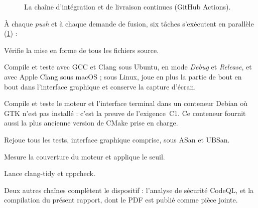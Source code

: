 \begin{figure}[ht]
    \caption{La chaîne d'intégration et de livraison continues (GitHub Actions).}
    \label{fig-ci}
\end{figure}

À chaque \emph{push} et à chaque demande de fusion, six tâches s'exécutent en parallèle
(\cref{fig-ci}) :

\begin{description}[style=nextline, leftmargin=1.2em]
    \item[format] Vérifie la mise en forme de tous les fichiers source.
    \item[build] Compile et teste avec GCC et Clang sous Ubuntu, en mode \emph{Debug} et
          \emph{Release}, et avec Apple Clang sous macOS ; sous Linux, joue en plus la partie de
          bout en bout dans l'interface graphique et conserve la capture d'écran.
    \item[headless] Compile et teste le moteur et l'interface terminal dans un conteneur
          Debian où GTK n'est pas installé : c'est la preuve de l'exigence~C1. Ce conteneur
          fournit aussi la plus ancienne version de CMake prise en charge.
    \item[sanitizers] Rejoue tous les tests, interface graphique comprise, sous ASan et
          UBSan.
    \item[coverage] Mesure la couverture du moteur et applique le seuil.
    \item[lint] Lance clang-tidy et cppcheck.
\end{description}

Deux autres chaînes complètent le dispositif : l'analyse de sécurité CodeQL, et la
compilation du présent rapport, dont le PDF est publié comme pièce jointe.

